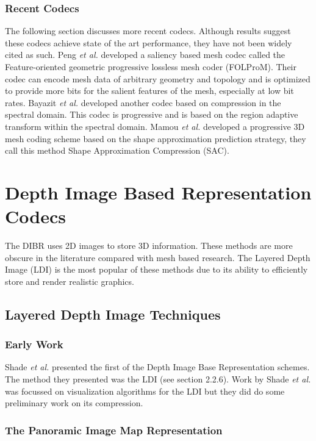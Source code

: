 \subsubsection{Recent Codecs}

The following section discusses more recent codecs. Although results suggest these codecs achieve state of the art performance, they have not been widely cited as such. Peng \textit{et al.} \cite{Peng10Feature} developed a saliency based mesh codec called the Feature-oriented geometric progressive lossless mesh coder (FOLProM). Their codec can encode mesh data of arbitrary geometry and topology and is optimized to provide more bits for the salient features of the mesh, especially at low bit rates. Bayazit \textit{et al.} \cite{Bayazit103DMesh} developed another codec based on compression in the spectral domain. This codec is progressive and is based on the region adaptive transform within the spectral domain. Mamou \textit{et al.} \cite{Mamou11Multi} developed a progressive 3D mesh coding scheme based on the shape approximation prediction strategy, they call this method Shape Approximation Compression (SAC). 

\section{Depth Image Based Representation Codecs}

The DIBR uses 2D images to store 3D information. These methods are more obscure in the literature compared with mesh based research. The Layered Depth Image (LDI) is the most popular of these methods due to its ability to efficiently store and render realistic graphics.

\subsection{Layered Depth Image Techniques}

\subsubsection{Early Work}

Shade \textit{et al.} \cite{Shade98Layered} presented the first of the Depth Image Base Representation schemes. The method they presented was the LDI (see section 2.2.6). Work by Shade \textit{et al.} was focussed on visualization algorithms for the LDI but they did do some preliminary work on its compression.

\subsubsection{The Panoramic Image Map Representation}

